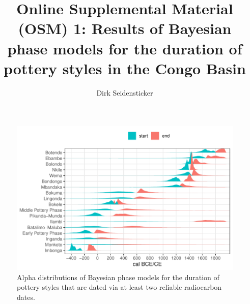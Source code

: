 \documentclass[]{article}
\title{Online Supplemental Material (OSM) 1: Results of Bayesian phase models for the duration of pottery styles in the Congo Basin}
\author{Dirk Seidensticker}
\begin{document}
\maketitle

\begin{figure}[H]
	\centering
	\includegraphics[width=\textwidth]{fig_bayesphases.pdf}
	\caption{Alpha distributions of Bayesian phase models for the duration of pottery styles \citep[cf.][]{Crema.2020a,Crema.2021a} that are dated via at least two reliable radiocarbon dates.}
	\label{fig:bayes}
\end{figure}
\end{document}
